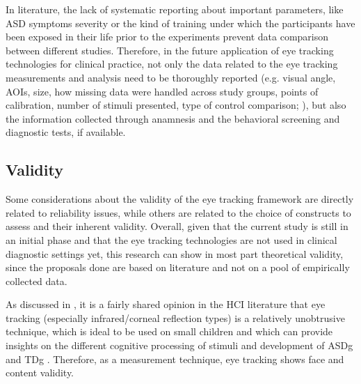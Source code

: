 In literature, the lack of systematic reporting about important parameters, like ASD symptoms severity \citep{chitategmark2016socialattention} or the kind of training under which the participants have been exposed in their life prior to the experiments \citep{boraston2007eyetrackingASD} prevent data comparison between different studies. Therefore, in the future application of eye tracking technologies for clinical practice, not only the data related to the eye tracking measurements and analysis need to be thoroughly reported (e.g. visual angle, AOIs, size, how missing data were handled across study groups, points of calibration, number of stimuli presented, type of control comparison; \citealp{frazier2017socialgaze}), but also the information collected through anamnesis and the behavioral screening and diagnostic tests, if available.


\subsection{Validity}
\label{sec:fwkvalidity}

Some considerations about the validity of the eye tracking framework are directly related to reliability issues, while others are related to the choice of constructs to assess and their inherent validity.
Overall, given that the current study is still in an initial phase and that the eye tracking technologies are not used in clinical diagnostic settings yet, this research can show in most part theoretical validity, since the proposals done are based on literature and not on a pool of empirically collected data.

As discussed in , it is a fairly shared opinion in the HCI literature that eye tracking (especially infrared/corneal reflection types) is a relatively unobtrusive technique, which is ideal to be used on small children and which can provide insights on the different cognitive processing of stimuli and development of ASDg and TDg \citep{subrahmaniam2013animation,giordano2017eyetrackersystem,samad2017markers,bolte2016detection,falck-ytter2013eyetrackingASD}. Therefore, as a measurement technique, eye tracking shows face and content validity.

